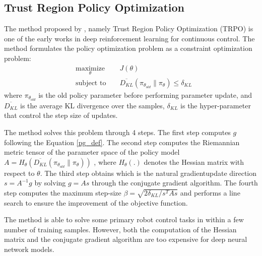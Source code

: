 \subsection{Trust Region Policy Optimization}
The method proposed by \cite{schulman2015trust}, namely Trust Region Policy Optimization (TRPO) is one of the early works in deep reinforcement learning for continuous control. The method formulates the policy optimization problem as a constraint optimization problem:
\begin{equation}
    \begin{aligned}
&    \underset{\theta}{\text{maximize}} 
&& J(\theta) \\
& \text{subject to } 
&& \overline{D_{KL}}(\pi_{\theta_{old}}\|\pi_\theta) \leq \delta_{KL}\label{trpo_obj}\end{aligned}
\end{equation}
where $\pi_{\theta_{old}}$ is the old policy parameter before performing  parameter update, and $\overline{D_{KL}}$ is the average KL divergence over the samples, $\delta_{KL}$ is the hyper-parameter that control the step size of updates.

The method solves this problem through 4 steps. The first step computes $g$ following the Equation \ref{pg_def}. 
The second step computes the Riemannian metric tensor of the parameter space of the policy model $A = H_{\theta}\left(\overline{D_{KL}}(\pi_{\theta_{old}}\|\pi_\theta)\right)$ , where $H_{\theta}(.)$ denotes the Hessian matrix with respect to $\theta$. 
The third step obtains which is the natural gradientupdate direction $s=A^{-1}g$ by solving $g=As$ through the conjugate gradient algorithm.
The fourth step computes the maximum step-size $\beta= \sqrt{2\delta_{KL}/s^TAs}$ and performs a line search to ensure the improvement of the objective function.

The method is able to solve some primary robot control tasks in \cite{openaigym} within a few number of training samples. However, both the computation of the Hessian matrix and the conjugate gradient algorithm are too expensive for deep neural network models.

